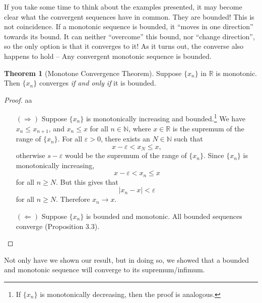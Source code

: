 \documentclass{article}
\newcommand{\N}{\mathbb{N}}
\newcommand{\R}{\mathbb{R}}
\theoremstyle{definition}
\newtheorem{theorem}{Theorem}[section]
\begin{document}
If you take some time to think about the examples presented, it may become clear what the convergent sequences have in common. They are bounded! This is not coincidence. If a monotonic sequence is bounded, it ``moves in one direction'' towards its bound. It can neither ``overcome'' this bound, nor ``change direction'', so the only option is that it converges to it! As it turns out, the converse also happens to hold -- Any convergent monotonic sequence is bounded.  
\begin{theorem}[Monotone Convergence Theorem]
	Suppose $ \{x_n\} $ in $ \R $ is monotonic. Then $ \{x_n\} $ converges \textit{if and only if} it is bounded.
\end{theorem}
\begin{proof}{\color{white}aa}
	\begin{enumerate}
	\item [$ (\Longrightarrow) $] Suppose $ \{x_n\} $ is monotonically increasing and bounded.\footnote{If $ \{x_n\} $ is monotonically decreasing, then the proof is analogous.} We have $ x_n\le x_{n+1} $, and $ x_n\le x $ for all $ n\in\N $, where $ x\in\R $ is the supremum of the range of $ \{x_n\} $.  For all $ \varepsilon>0 $, there exists an $ N\in\N $ such that $$x-\varepsilon<x_N\le x, $$ otherwise $ s-\varepsilon $ would be the supremum of the range of $ \{x_n\} $. Since $ \{x_n\} $ is monotonically increasing, $$ x-\varepsilon<x_n\le x $$ for all $ n\ge N $. But this gives that $$|x_n-x|<\varepsilon $$ for all $ n\ge N $. Therefore $ x_n\to x $. 
	\item [$ (\Longleftarrow) $] Suppose $ \{x_n\} $ is bounded and monotonic. All bounded sequences converge (Proposition 3.3).
	\end{enumerate}
\end{proof}
Not only have we shown our result, but in doing so, we showed that a bounded and monotonic sequence will converge to its supremum/infimum. 
\end{document}
